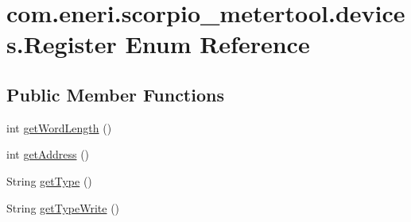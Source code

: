 \hypertarget{enumcom_1_1eneri_1_1scorpio__metertool_1_1devices_1_1_register}{}\section{com.\+eneri.\+scorpio\+\_\+metertool.\+devices.\+Register Enum Reference}
\label{enumcom_1_1eneri_1_1scorpio__metertool_1_1devices_1_1_register}
\subsection*{Public Member Functions}
\begin{DoxyCompactItemize}
\item 
int \hyperlink{enumcom_1_1eneri_1_1scorpio__metertool_1_1devices_1_1_register_a60bbb730868cbae9465eb03a1672f51e}{get\+Word\+Length} ()
\item 
int \hyperlink{enumcom_1_1eneri_1_1scorpio__metertool_1_1devices_1_1_register_a0641c682938b90c5353e19c0d9b32973}{get\+Address} ()
\item 
String \hyperlink{enumcom_1_1eneri_1_1scorpio__metertool_1_1devices_1_1_register_a439d4d56736ab145fe61e9269562ae46}{get\+Type} ()
\item 
String \hyperlink{enumcom_1_1eneri_1_1scorpio__metertool_1_1devices_1_1_register_a4efe2f464d85fbf0abe28e8b4daf68fd}{get\+Type\+Write} ()
\end{DoxyCompactItemize}
